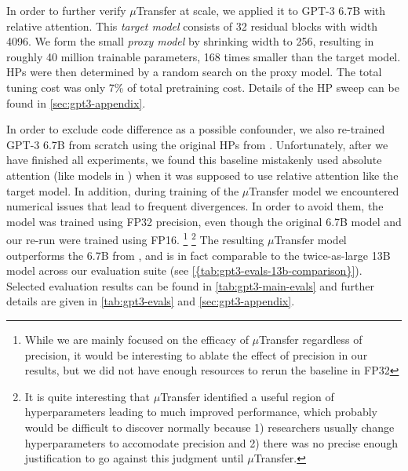 \documentclass{article}
\theoremstyle{definition}
\begin{document}
In order to further verify $\mu$Transfer at scale, we applied it to GPT-3 6.7B \cite{brown2020language} with relative attention.
This \emph{target model} consists of 32 residual blocks with width 4096.
We form the small \emph{proxy model} by shrinking width to 256, resulting in roughly 40 million trainable parameters, 168 times smaller than the target model.
HPs were then determined by a random search on the proxy model.
The total tuning cost was only 7\% of total pretraining cost.
Details of the HP sweep can be found in \cref{sec:gpt3-appendix}.

In order to exclude code difference as a possible confounder, we also re-trained GPT-3 6.7B from scratch using the original HPs from \cite{brown2020language}.
Unfortunately, after we have finished all experiments, we found this baseline mistakenly used absolute attention (like models in \cite{brown2020language}) when it was supposed to use relative attention like the target model.
In addition, during training of the $\mu$Transfer model we encountered numerical issues that lead to frequent divergences.
In order to avoid them, the model was trained using FP32 precision, even though the original 6.7B model and our re-run were trained using FP16.
\footnote{
  While we are mainly focused on the efficacy of $\mu$Transfer regardless of precision, it would be interesting to ablate the effect of precision in our results, but we did not have enough resources to rerun the baseline in FP32}
\footnote{
  It is quite interesting that $\mu$Transfer identified a useful region of hyperparameters leading to much improved performance, which probably would be difficult to discover normally because 1) researchers usually change hyperparameters to accomodate precision and 2) there was no precise enough justification to go against this judgment until $\mu$Transfer.
}
The resulting $\mu$Transfer model outperforms the 6.7B from \cite{brown2020language}, and is in fact comparable to the twice-as-large 13B model across our evaluation suite (see \cref{{tab:gpt3-evals-13b-comparison}}).
Selected evaluation results can be found in \cref{tab:gpt3-main-evals} and further details are given in \cref{tab:gpt3-evals} and \cref{sec:gpt3-appendix}.
\end{document}
